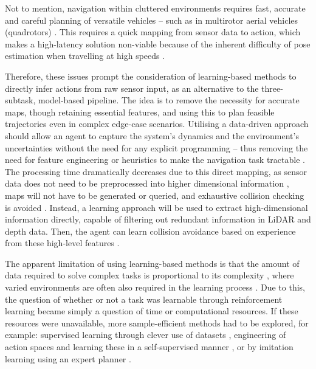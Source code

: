 Not to mention, navigation within cluttered environments requires fast, accurate and careful planning of versatile vehicles -- such as in multirotor aerial vehicles (quadrotors) \cite{MultirotorAerialVehicles}. This requires a quick mapping from sensor data to action, which makes a high-latency solution non-viable because of the inherent difficulty of pose estimation when travelling at high speeds \cite{NavRep_unsupervised, HighSpeedFlightWild}. 

Therefore, these issues prompt the consideration of learning-based methods to directly infer actions from raw sensor input, as an alternative to the three-subtask, model-based pipeline. The idea is to remove the necessity for accurate maps, though retaining essential features, and using this to plan feasible trajectories even in complex edge-case scenarios.
Utilising a data-driven approach should allow an agent to capture the system's dynamics and the environment's uncertainties without the need for any explicit programming \cite{RLinRoboticsSurvey} -- thus removing the need for feature engineering or heuristics to make the navigation task tractable \cite{LearningStateRepresentation}. 
The processing time dramatically decreases due to this direct mapping, as sensor data does not need to be preprocessed into higher dimensional information \cite{fan2018distributed, stereoCamTracking}, maps will not have to be generated or queried, and exhaustive collision checking is avoided \cite{LBplanner}.
Instead, a learning approach will be used to extract high-dimensional information directly, capable of filtering out redundant information in LiDAR and depth data. Then, the agent can learn collision avoidance based on experience from these high-level features \cite{LearningStateRepresentation}. 

The apparent limitation of using learning-based methods is that the amount of data required to solve complex tasks is proportional to its complexity \cite{LearningWalkMassivelyParallel}, where varied environments are often also required in the learning process \cite{RichEnvironments}. Due to this, the question of whether or not a task was learnable through reinforcement learning became simply a question of time or computational resources. If these resources were unavailable, more sample-efficient methods had to be explored, for example: supervised learning through clever use of datasets \cite{cad2rl, dronet}, engineering of action spaces and learning these in a self-supervised manner \cite{deepCollisionPredictorOracle}, or by imitation learning using an expert planner \cite{LBplanner, pfeiffer2017perception, HighSpeedFlightWild}.

